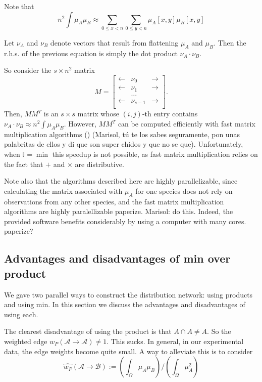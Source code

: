 \documentclass[12pt]{article}
\numberwithin{equation}{section} %
\numberwithin{figure}{section} %
\def\cA{{\mathcal{A}}}
\def\cB{{\mathcal{B}}}
\def\II{{\mathbb{I}}}
\theoremstyle{definition}
\def\tcr#1{\textcolor{MyRed}{#1}}
\begin{document}
	Note that 
		$$n^2\int \mu_A \mu_B \approx \sum_{0\leq x < n} \sum_{0\leq y < n} \mu_A[x,y]\mu_B[x,y]$$
	
	Let $\nu_A$ and $\nu_B$ denote vectors that result from flattening $\mu_A$ and $\mu_B$. Then the r.h.s. of the previous equation is simply the dot product $\nu_A\cdot \nu_B$.
	
	So consider the $s\times n^2$ matrix 
	$$M = \begin{bmatrix}
	        \longleftarrow & \nu_0 & \longrightarrow \\
	        \longleftarrow & \nu_1 & \longrightarrow \\
	          & \dots &   \\
					\longleftarrow & \nu_{s-1} & \longrightarrow \\
	      \end{bmatrix}.
	$$
Then, $MM^T$ is an $s\times s$ matrix whose $(i,j)$-th entry contains $\nu_A\cdot \nu_B \approx n^2\int \mu_A \mu_B$. However, $MM^T$ can be computed efficiently with fast matrix multiplication algorithms (\cite{strassen}) \tcr{(Marisol, tú te los sabes seguramente, pon unas palabritas de ellos y di que son super chidos y que no se que)}. Unfortunately, when $\II = \min$ this speedup is not possible, as fast matrix multiplication relies on the fact that $+$ and $\times$ are distributive.

Note also that the algorithms described here are highly parallelizable, since calculating the matrix associated with $\mu_A$ for one species does not rely on observations from any other species, and the fast matrix multiplication algorithms are highly paralellizable \tcr{paperize. Marisol: do this}. Indeed, the provided software benefits considerably by using a computer with many cores. \tcr{paperize?}

\subsection{Advantages and disadvantages of min over product}

We gave two parallel ways to construct the distribution network: using products and using min. In this section we discuss the advantages and disadvantages of using each.

The clearest disadvantage of using the product is that $A\cap A \neq A$. So the weighted edge $w_P(\cA \to \cA) \neq 1$. This sucks. In general, in our experimental data, the edge weights become quite small. A way to alleviate this is to consider
	$$\widehat{w_P}(\cA \to \cB) := \left(\int_\Omega \mu_A\mu_B\right)\big/\left(\int_\Omega \mu_A^2\right)$$
	
\end{document}
